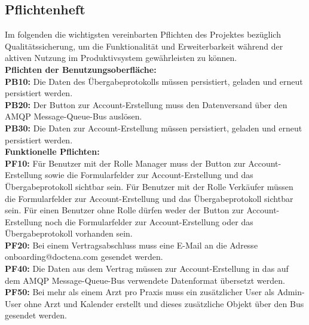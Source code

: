 \subsection{Pflichtenheft}
\label{sec:Pflichtenheft}
Im folgenden die wichtigsten vereinbarten Pflichten des Projektes bezüglich Qualitätssicherung, um die Funktionalität und Erweiterbarkeit während der aktiven Nutzung im Produktivsystem gewährleisten zu können.\\[1.5ex]
\textbf{Pflichten der Benutzungsoberfläche:}\\[1.5ex]
\textbf{PB10:} Die Daten des Übergabeprotokolls müssen persistiert, geladen und erneut persistiert werden.\\
\textbf{PB20:} Der Button zur Account-Erstellung muss den Datenversand über den AMQP Message-Queue-Bus auslösen.\\
\textbf{PB30:} Die Daten zur Account-Erstellung müssen persistiert, geladen und erneut persistiert werden.\\[1.5ex]
\textbf{Funktionelle Pflichten:}\\[1.5ex]
\textbf{PF10:} Für Benutzer mit der Rolle Manager muss der Button zur Account-Erstellung sowie die Formularfelder zur Account-Erstellung und das Übergabeprotokoll sichtbar sein. Für Benutzer mit der Rolle Verkäufer müssen die Formularfelder zur Account-Erstellung und das Übergabeprotokoll sichtbar sein. Für einen Benutzer ohne Rolle dürfen weder der Button zur Account-Erstellung noch die Formularfelder zur Account-Erstellung oder das Übergabeprotokoll vorhanden sein.\\
\textbf{PF20:} Bei einem Vertragsabschluss muss eine E-Mail an die Adresse onboarding@doctena.com gesendet werden.\\
\textbf{PF40:} Die Daten aus dem Vertrag müssen zur Account-Erstellung in das auf dem AMQP Message-Queue-Bus verwendete Datenformat übersetzt werden.\\
\textbf{PF50:} Bei mehr als einem Arzt pro Praxis muss ein zusätzlicher User als Admin-User ohne Arzt und Kalender erstellt und dieses zusätzliche Objekt über den Bus gesendet werden.\\

